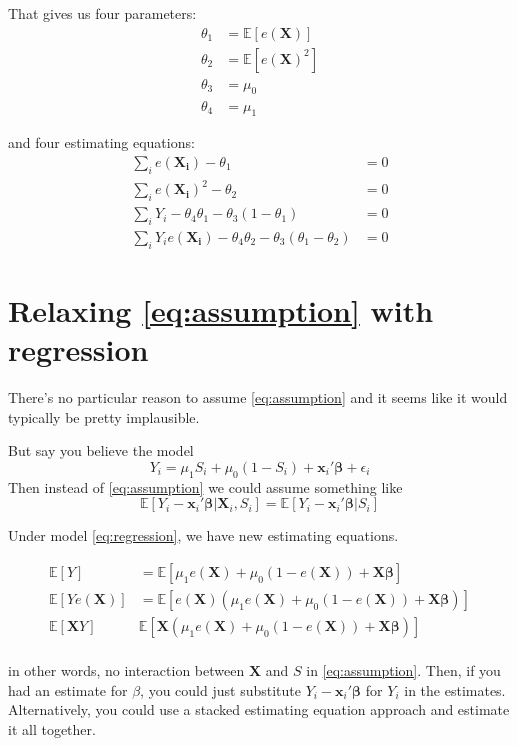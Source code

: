 \documentclass[11pt]{article} %
\newcommand{\EE}{\mathbb{E}}
\newcommand{\pp}{e(\bm{X})}
\newcommand{\ppi}{e(\bm{X_i})}
\begin{document}
That gives us four parameters:
\begin{align*}
  \theta_1&=\EE[\pp]\\
  \theta_2&=\EE[\pp^2]\\
  \theta_3&=\mu_0\\
  \theta_4&=\mu_1
\end{align*}

and four estimating equations:
\begin{align*}
  \sum_i \ppi-\theta_1&=0\\
  \sum_i \ppi^2-\theta_2&=0\\
  \sum_i Y_i-\theta_4\theta_1-\theta_3(1-\theta_1)&=0\\
  \sum_i Y_i\ppi-\theta_4\theta_2-\theta_3(\theta_1-\theta_2)&=0
\end{align*}


\section{Relaxing \eqref{eq:assumption} with regression}
There's no particular reason to assume \eqref{eq:assumption} and it seems like it would typically be pretty implausible. 

But say you believe the model
\begin{equation}\label{eq:regression}
Y_i=\mu_1S_i+\mu_0(1-S_i)+\bm{x}_i'\bm{\beta}+\epsilon_i
\end{equation}
 Then instead of \eqref{eq:assumption} we could assume something like
\begin{equation*}
\EE[Y_i-\bm{x}_i'\bm{\beta}|\bm{X}_i,S_i]=\EE[Y_i-\bm{x}_i'\bm{\beta}|S_i]
\end{equation*}

Under model \eqref{eq:regression}, we have new estimating equations.


\begin{align*}
  \EE[Y]&=\EE\left[\mu_1\pp+\mu_0(1-\pp)+\bm{X}\bm{\beta}\right]\\
  \EE[Y\pp]&=\EE\left[\pp\left(\mu_1\pp+\mu_0(1-\pp)+\bm{X}\bm{\beta}\right)\right]\\
  \EE[\bm{X}Y]&\EE\left[\bm{X}\left(\mu_1\pp+\mu_0(1-\pp)+\bm{X}\bm{\beta}\right)\right]\\
\end{align*}

in other words, no interaction between $\bm{X}$ and $S$ in \eqref{eq:assumption}. 
Then, if you had an estimate for $\beta$, you could just substitute $Y_i-\bm{x}_i'\bm{\beta}$ for $Y_i$ in the estimates. 
Alternatively, you could use a stacked estimating equation approach and estimate it all together.



\end{document}
